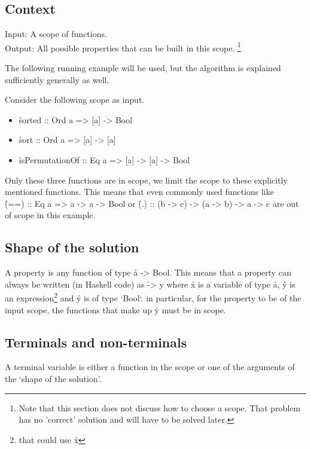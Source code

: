 \documentclass[a4paper, 11pt]{article}
\begin{document}
\subsection{Context}

Input: A scope of functions.\\
Output: All possible properties that can be built in this scope.
\footnote{
  Note that this section does not discuss how to choose a scope.
  That problem has no 'correct' solution and will have to be solved later.
}

The following running example will be used, but the algorithm is explained sufficiently generally as well.

Consider the following scope as input.

\begin{itemize}
  \item \h{sorted :: Ord a => [a] -> Bool}
  \item \h{sort :: Ord a => [a] -> [a]}
  \item \h{isPermutationOf :: Eq a => [a] -> [a] -> Bool}
\end{itemize}

Only these three functions are in scope, we limit the scope to these explicitly mentioned functions.
This means that even commonly used functions like\\ \h{(==) :: Eq a => a -> a -> Bool} or \h{(.) :: (b -> c) -> (a -> b) -> a -> c} are out of scope in this example.

\subsection{Shape of the solution}

A property is any function of type \h{a -> Bool}.
This means that a property can always be written (in Haskell code) as \h{\x -> y} where \h{x} is a variable of type \h{a}, \h{y} is an expression\footnote{that could use \h{x}} and \h{y} is of type `Bool`.
in particular, for the property to be of the input scope, the functions that make up \h{y} must be in scope.

\subsection{Terminals and non-terminals}

\begin{de}
  A terminal variable is either a function in the scope or one of the arguments of the `shape of the solution'.
\end{de}
\end{document}
